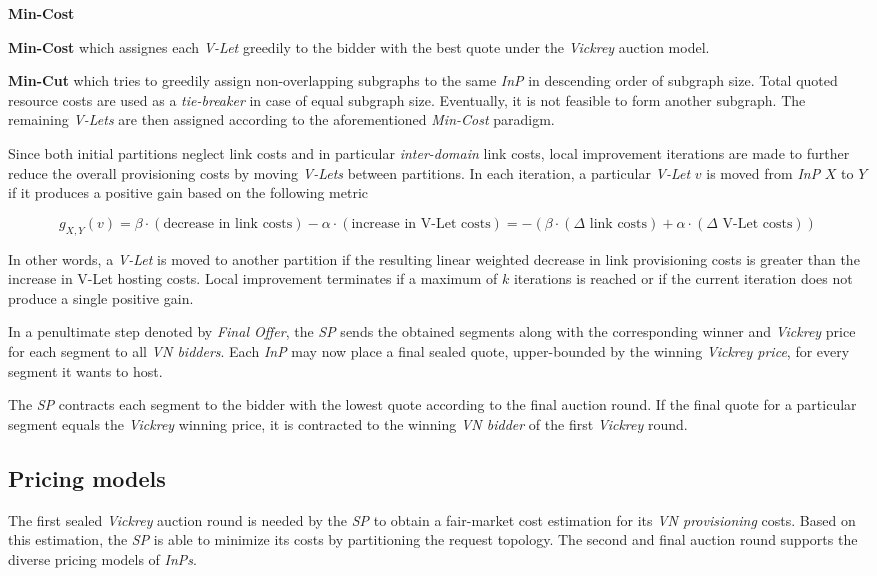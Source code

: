 \documentclass[prodmode,acmtomccap]{acmlarge}
\begin{document}
\begin{describe}{{\bfseries Min-Cost\/}}
	\item[\bfseries Min-Cost] which assignes each \emph{V-Let} greedily to the bidder with the best quote under the \emph{Vickrey} auction model.
	\item[\bfseries Min-Cut] which tries to greedily assign non-overlapping subgraphs to the same \emph{InP} in descending order of subgraph size. Total quoted resource costs are used as a \emph{tie-breaker}
		in case of equal subgraph size. Eventually, it is not feasible to form another subgraph. The remaining \emph{V-Lets} are then assigned according to the aforementioned \emph{Min-Cost} paradigm.
\end{describe}

Since both initial partitions neglect link costs and in particular \emph{inter-domain} link costs, local improvement iterations are made to further reduce the overall provisioning costs by moving
\emph{V-Lets} between partitions. In each iteration, a particular \emph{V-Let} $v$ is moved from \emph{InP} $X$ to $Y$ if it produces a positive gain based on the following metric

$$
	g_{X,Y}(v) = \beta \cdot (\text{decrease in link costs}) - \alpha \cdot (\text{increase in V-Let costs}) = -\left(\beta \cdot (\Delta \text{ link costs}) + \alpha \cdot (\Delta \text{ V-Let costs})\right) 
$$

In other words, a \emph{V-Let} is moved to another partition if the resulting linear weighted decrease in link provisioning costs is greater than the increase in V-Let hosting costs.
Local improvement terminates if a maximum of $k$ iterations is reached or if the current iteration does not produce a single positive gain.

In a penultimate step denoted by \emph{Final Offer}, the \emph{SP} sends the obtained segments along with the corresponding winner and \emph{Vickrey} price for each segment to all \emph{VN bidders}.
Each \emph{InP} may now place a final sealed quote, upper-bounded by the winning \emph{Vickrey price}, for every segment it wants to host.

The \emph{SP} contracts each segment to the bidder with the lowest quote according to the final auction round. If the final quote for a particular segment equals the \emph{Vickrey} winning price, it is contracted to
the winning \emph{VN bidder} of the first \emph{Vickrey} round.

\subsection{Pricing models}
The first sealed \emph{Vickrey} auction round is needed by the \emph{SP} to obtain a fair-market cost estimation for its \emph{VN provisioning} costs. 
Based on this estimation, the \emph{SP} is able to minimize its costs by partitioning the request topology.
The second and final auction round supports the diverse pricing models of \emph{InPs}.
\end{document}
